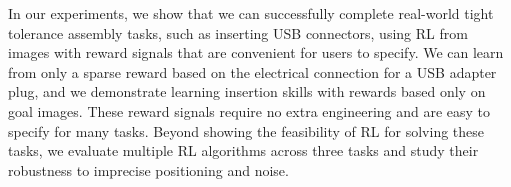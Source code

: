 
In our experiments, we show that we can successfully complete real-world tight tolerance assembly tasks, such as inserting USB connectors, using RL from images with reward signals that are convenient for users to specify.
We can learn from only a sparse reward based on the electrical connection for a USB adapter plug, and we demonstrate learning insertion skills with rewards based only on goal images.
These reward signals require no extra engineering and are easy to specify for many tasks. 
Beyond showing the feasibility of RL for solving these tasks, we evaluate multiple RL algorithms across three tasks and study their robustness to imprecise positioning and noise.
